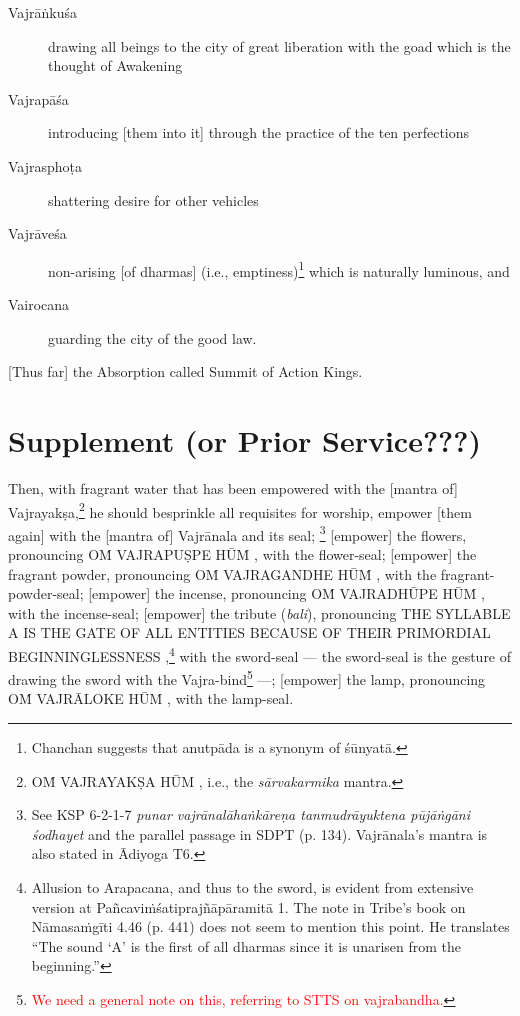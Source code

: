 \documentclass[11pt]{book}
\makeatletter
\def\fakesc#1{%
  \begingroup%
  \xdef\fake@name{\csname\curr@fontshape/\f@size\endcsname}%
  \fontsize{1.3\fontdimen8\fake@name}{\baselineskip}\selectfont%
  \uppercase{#1}%
  \endgroup%
}
\newcommand{\mantra}[1]{\fakesc{#1}}
\newcommand{\red}[1]{\textcolor{red}{#1}}
\newcommand{\skt}[1]{\emph{#1}}
\makeatother
\begin{document}
\begin{description}
\item[Vajrāṅkuśa] drawing all beings to the city of great liberation with the goad which is the thought of Awakening 
\item[Vajrapāśa] introducing [them into it] through the practice of the ten perfections
\item[Vajrasphoṭa] shattering desire for other vehicles
\item[Vajrāveśa] non-arising [of dharmas] (i.e., emptiness)\footnote{Chanchan suggests that anutpāda is a synonym of śūnyatā.} which is naturally luminous, and
\item[Vairocana] guarding the city of the good law.
\end{description}

[Thus far] the Absorption called Summit of Action Kings.
 
 
\section{Supplement (or Prior Service???)}

Then, with fragrant water that has been empowered with the [mantra of] Vajrayakṣa,\footnote{\mantra{oṁ vajrayakṣa hūm}, i.e., the \emph{sārvakarmika} mantra.} he should besprinkle all requisites for worship, empower [them again] with the [mantra of] Vajrānala and its seal;%
\footnote{See KSP 6-2-1-7 \skt{punar vajrānalāhaṅkāreṇa tanmudrāyuktena pūjāṅgāni śodhayet} and the parallel passage in SDPT (p. 134). Vajrānala's mantra is also stated in Ādiyoga T6.} 
[empower] the flowers, pronouncing \mantra{oṁ vajrapuṣpe hūṁ}, with the flower-seal; 
[empower] the fragrant powder, pronouncing \mantra{oṁ vajragandhe hūṁ}, with the fragrant-powder-seal; 
[empower] the incense, pronouncing \mantra{oṁ vajradhūpe hūṁ}, with the incense-seal; 
[empower] the tribute (\skt{bali}), pronouncing \mantra{the syllable a is the gate of all entities because of their primordial beginninglessness},\footnote{Allusion to Arapacana, and thus to the sword, is evident from extensive version at Pañcaviṁśatiprajñāpāramitā 1. 
 The note in Tribe's book on Nāmasaṁgīti 4.46 (p. 441) does not seem to mention this point. He translates “The sound ‘A’ is the first of all dharmas since it is unarisen from the beginning.”} with the sword-seal — the sword-seal is the gesture of drawing the sword with the Vajra-bind\footnote{\red{We need a general note on this, referring to STTS on vajrabandha.}} —; 
 [empower] the lamp, pronouncing \mantra{oṁ vajrāloke hūṁ}, with the lamp-seal.
\end{document}
